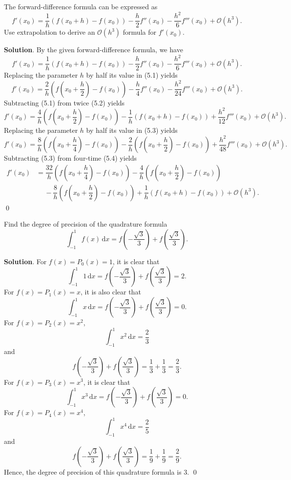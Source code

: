 \documentclass[11pt]{article}
\theoremstyle{break}
\newcommand{\ddi}{\text{$\,$d}}
\numberwithin{equation}{theorem}
\begin{document}
\newpage
\begin{problem}\label{problem 5} %
    The forward-difference formula can be expressed as $$f'(x_0)=\dfrac{1}{h}\left(f(x_0+h)-f(x_0)\right)-\dfrac{h}{2}f''(x_0)-\dfrac{h^2}{6}f'''(x_0)+\mathcal{O}(h^3).$$ Use extrapolation to derive an $\mathcal{O}(h^3)$ formula for $f'(x_0)$.
\end{problem}
\textbf{Solution}. By the given forward-difference formula, we have 
\begin{equation}
    f'(x_0)=\dfrac{1}{h}\left(f(x_0+h)-f(x_0)\right)-\dfrac{h}{2}f''(x_0)-\dfrac{h^2}{6}f'''(x_0)+\mathcal{O}(h^3).
\end{equation}
Replacing the parameter $h$ by half its value in (5.1) yields 
\begin{equation}
    f'(x_0)=\dfrac{2}{h}\left(f\left(x_0+\dfrac{h}{2}\right)-f(x_0)\right)-\dfrac{h}{4}f''(x_0)-\dfrac{h^2}{24}f'''(x_0)+\mathcal{O}(h^3).
\end{equation}
Subtracting (5.1) from twice (5.2) yields
\begin{equation}
    f'(x_0)=\dfrac{4}{h}\left(f\left(x_0+\dfrac{h}{2}\right)-f(x_0)\right)-\dfrac{1}{h}\left(f(x_0+h)-f(x_0)\right)+\dfrac{h^2}{12}f'''(x_0)+\mathcal{O}(h^3).
\end{equation}
Replacing the parameter $h$ by half its value in (5.3) yields
\begin{equation}
    f'(x_0)=\dfrac{8}{h}\left(f\left(x_0+\dfrac{h}{4}\right)-f(x_0)\right)-\dfrac{2}{h}\left(f\left(x_0+\dfrac{h}{2}\right)-f(x_0)\right)+\dfrac{h^2}{48}f'''(x_0)+\mathcal{O}(h^3).
\end{equation}
Subtracting (5.3) from four-time (5.4) yields
\begin{align*}
    f'(x_0)&=\dfrac{32}{h}\left(f\left(x_0+\dfrac{h}{4}\right)-f(x_0)\right)-\dfrac{4}{h}\left(f\left(x_0+\dfrac{h}{2}\right)-f(x_0)\right)\\
    &\quad\ -\dfrac{8}{h}\left(f\left(x_0+\dfrac{h}{2}\right)-f(x_0)\right)+\dfrac{1}{h}\left(f(x_0+h)-f(x_0)\right)+\mathcal{O}(h^3).
\end{align*}
\qed

\newpage
\begin{problem}\label{problem 6} %
    Find the degree of precision of the quadrature formula $$\int_{-1}^{1}f(x)\ddi x=f\left(-\dfrac{\sqrt{3}}{3}\right)+f\left(\dfrac{\sqrt{3}}{3}\right).$$
\end{problem}
\textbf{Solution}. For $f(x)=P_0(x)=1$, it is clear that $$\int_{-1}^{1}1\ddi x=f\left(-\dfrac{\sqrt{3}}{3}\right)+f\left(\dfrac{\sqrt{3}}{3}\right)=2.$$ For $f(x)=P_1(x)=x$, it is also clear that $$\int_{-1}^{1}x\ddi x=f\left(-\dfrac{\sqrt{3}}{3}\right)+f\left(\dfrac{\sqrt{3}}{3}\right)=0.$$ For $f(x)=P_2(x)=x^2$, $$\int_{-1}^{1}x^2\ddi x=\dfrac{2}{3}$$ and $$f\left(-\dfrac{\sqrt{3}}{3}\right)+f\left(\dfrac{\sqrt{3}}{3}\right)=\dfrac{1}{3}+\dfrac{1}{3}=\dfrac{2}{3}.$$ For $f(x)=P_3(x)=x^3$, it is clear that $$\int_{-1}^{1}x^3\ddi x=f\left(-\dfrac{\sqrt{3}}{3}\right)+f\left(\dfrac{\sqrt{3}}{3}\right)=0.$$ For $f(x)=P_4(x)=x^4$, $$\int_{-1}^{1}x^4\ddi x=\dfrac{2}{5}$$ and $$f\left(-\dfrac{\sqrt{3}}{3}\right)+f\left(\dfrac{\sqrt{3}}{3}\right)=\dfrac{1}{9}+\dfrac{1}{9}=\dfrac{2}{9}.$$ Hence, the degree of precision of this quadrature formula is $3$. \qed
\end{document}
